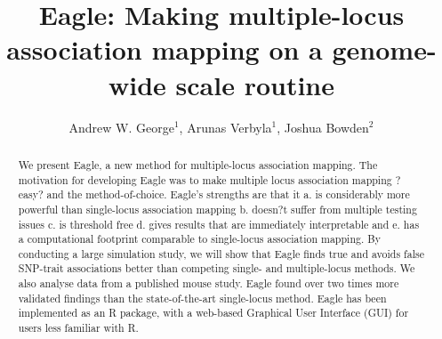 \documentclass{article}
\begin{document}
\title{Eagle: Making multiple-locus association mapping on a genome-wide scale routine}
\author{Andrew W. George$^1$, Arunas Verbyla$^1$, Joshua Bowden$^2$}

\maketitle





\begin{abstract}


We present Eagle, a new method for multiple-locus association mapping. The
motivation for developing Eagle was to make multiple locus association mapping ?easy? and the method-of-choice. 
Eagle's strengths are that it a. is considerably more powerful than single-locus association mapping b. doesn?t suffer from multiple testing issues c. is threshold free d. gives results that are immediately interpretable and e. has a computational footprint comparable to single-locus association mapping. 
By conducting a large simulation study, we will show that Eagle finds true and avoids false SNP-trait associations better than competing single- and 
multiple-locus methods. We also analyse data from a published mouse study. Eagle found over two times more validated findings than the state-of-the-art 
single-locus method. 
Eagle has been implemented as an R package, with a web-based Graphical User Interface (GUI) for users less familiar with R.

\end{abstract}
\end{document}
